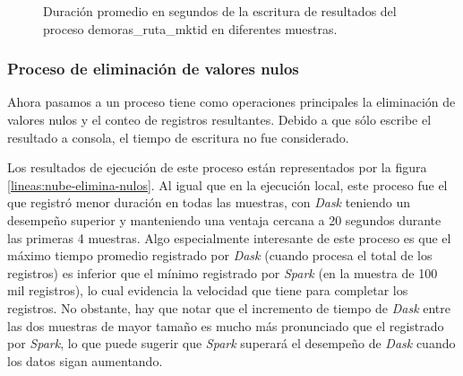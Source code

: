 \begin{figure}
\centering
{}
\caption{Duración promedio en segundos de la escritura de resultados del proceso demoras\_ruta\_mktid en diferentes muestras.}
\label{lineas:nube-demoras-ruta-mktid-write}
\end{figure}

\subsubsection{Proceso de eliminación de valores nulos}

Ahora pasamos a un proceso tiene como operaciones principales la eliminación de valores nulos y el conteo de registros resultantes. Debido a que sólo escribe el resultado a consola, el tiempo de escritura no fue considerado.

Los resultados de ejecución de este proceso están representados por la figura \ref{lineas:nube-elimina-nulos}. Al igual que en la ejecución local, este proceso fue el que registró menor duración en todas las muestras, con \textit{Dask} teniendo un desempeño superior y manteniendo una ventaja cercana a 20 segundos durante las primeras 4 muestras. Algo especialmente interesante de este proceso es que el máximo tiempo promedio registrado por \textit{Dask} (cuando procesa el total de los registros) es inferior que el mínimo registrado por \textit{Spark} (en la muestra de 100 mil registros), lo cual evidencia la velocidad que tiene para completar los registros. No obstante, hay que notar que el incremento de tiempo de \textit{Dask} entre las dos muestras de mayor tamaño es mucho más pronunciado que el registrado por \textit{Spark}, lo que puede sugerir que \textit{Spark} superará el desempeño de \textit{Dask} cuando los datos sigan aumentando. 

